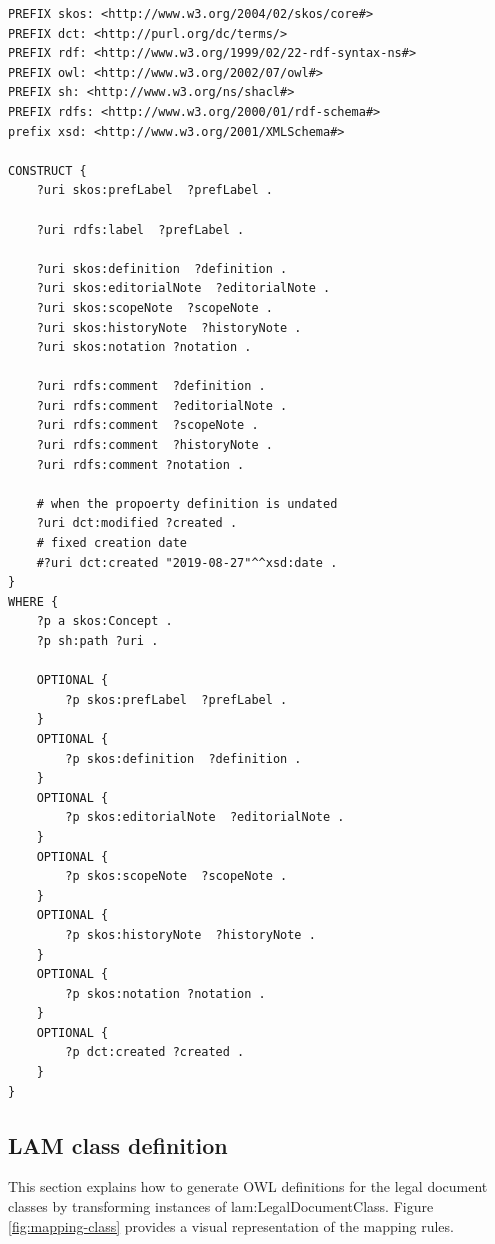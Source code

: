 \begin{lstlisting}[language=SPARQL, captionpos=b, caption={The transformation SPARQL query for editorial part of the LAM document properties}, label=lst:sparql-property-editorial]	
PREFIX skos: <http://www.w3.org/2004/02/skos/core#>
PREFIX dct: <http://purl.org/dc/terms/>
PREFIX rdf: <http://www.w3.org/1999/02/22-rdf-syntax-ns#>
PREFIX owl: <http://www.w3.org/2002/07/owl#>
PREFIX sh: <http://www.w3.org/ns/shacl#>
PREFIX rdfs: <http://www.w3.org/2000/01/rdf-schema#>
prefix xsd: <http://www.w3.org/2001/XMLSchema#>

CONSTRUCT { 
	?uri skos:prefLabel  ?prefLabel .    
	
	?uri rdfs:label  ?prefLabel .  
	
	?uri skos:definition  ?definition .  
	?uri skos:editorialNote  ?editorialNote .
	?uri skos:scopeNote  ?scopeNote .
	?uri skos:historyNote  ?historyNote .
	?uri skos:notation ?notation .
	
	?uri rdfs:comment  ?definition .  
	?uri rdfs:comment  ?editorialNote .
	?uri rdfs:comment  ?scopeNote .
	?uri rdfs:comment  ?historyNote .
	?uri rdfs:comment ?notation .
	
	# when the propoerty definition is undated 
	?uri dct:modified ?created .
	# fixed creation date
	#?uri dct:created "2019-08-27"^^xsd:date .
} 
WHERE { 
	?p a skos:Concept .
	?p sh:path ?uri .
	
	OPTIONAL {
		?p skos:prefLabel  ?prefLabel .
	}    
	OPTIONAL {
		?p skos:definition  ?definition .
	}
	OPTIONAL {
		?p skos:editorialNote  ?editorialNote .
	}
	OPTIONAL {
		?p skos:scopeNote  ?scopeNote .
	}
	OPTIONAL {
		?p skos:historyNote  ?historyNote .
	}
	OPTIONAL {
		?p skos:notation ?notation .
	}
	OPTIONAL {
		?p dct:created ?created .
	}
}
\end{lstlisting}


\subsection{LAM class definition}

	This section explains how to generate OWL definitions for the legal document classes by transforming instances of  lam:LegalDocumentClass. Figure \ref{fig:mapping-class} provides a visual representation of the mapping rules.

